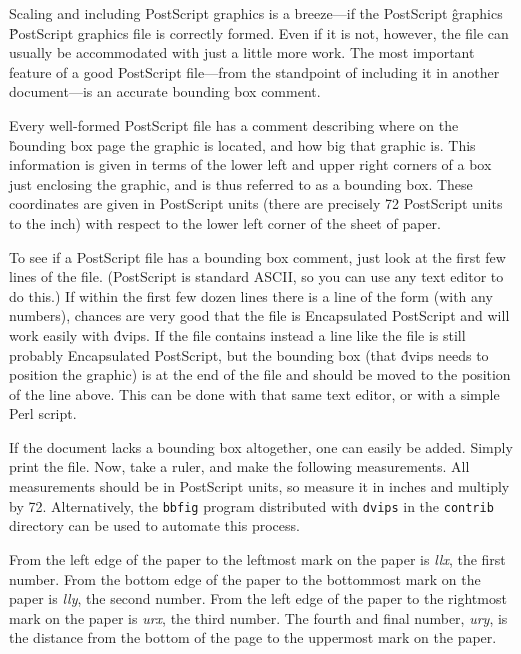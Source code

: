 
Scaling and including PostScript graphics is a breeze---if the PostScript
\^{graphics}
\^{PostScript graphics}
file is correctly formed.  Even if it is not, however, the file can usually
be accommodated with just a little more work.  The most important feature of
a good PostScript file---from the standpoint of including it in another
document---is an accurate bounding box comment.


Every well-formed PostScript file has a comment describing where on the
\^{bounding box}
page the graphic is located, and how big that graphic is.  This information
is given in terms of the lower left and upper right corners of a box just
enclosing the graphic, and is thus referred to as a bounding box.
These coordinates are given
in PostScript units (there are precisely 72 PostScript units to
the inch) with respect to the lower left corner of the sheet of paper.

To see if a PostScript file has a bounding box comment, just
look at the first few lines of the file.
(PostScript is standard ASCII, so you can use any text editor to do this.)
If within the first few dozen lines there is a line of the form
\noindent
(with any numbers), chances are very good that the file is Encapsulated
PostScript and will work easily with \.{dvips}.  If the file contains
instead a line like
\noindent
the file is still probably Encapsulated PostScript, but the bounding
box (that \.{dvips} needs to position the graphic) is at the end of the
file and should be moved to the position of the line above.  This can be
done with that same text editor, or with a simple Perl script.

If the document lacks a bounding box altogether, one can easily be added.
Simply print the file.  Now, take a ruler, and make the following measurements.
All measurements should be in PostScript units, so measure it in inches and
multiply by 72.  Alternatively, the {\tt bbfig} program distributed with
{\tt dvips} in the {\tt contrib} directory can be used to automate
this process.

From the left edge of the paper to the leftmost mark on the paper is
{\it llx}, the first number.  From the bottom edge of the paper to the
bottommost mark on the paper is {\it lly}, the second number.  From
the left edge of the paper to the rightmost mark on the paper is
{\it urx}, the third number.  The fourth and final number, {\it ury}, is
the distance from the bottom of the page to the uppermost mark on the
paper.

